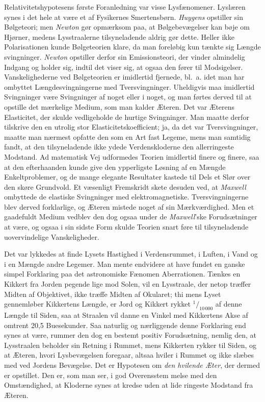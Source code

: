 \documentclass[12pt,a4paper]{article}
\newcommand{\opage}[1]{\marginnote{\footnotesize\textit{[#1]}}}
\begin{document}
Relativitetshypotesens første Foranledning var visse Lysfænomener. Lyslæren
synes i det hele at være et af Fysikernes Smertensbørn. \emph{Huygens}
opstiller sin Bølgeteori; men \emph{Newton} gør opmærksom paa, at
Bølgebevægelser kan bøje om Hjørner, medens Lysstraalerne tilsyneladende
aldrig gør dette. Heller ikke Polarisationen kunde Bølgeteorien klare, da man
foreløbig kun tænkte sig Længde\-%
\opage{3}svingninger. \emph{Newton} opstiller derfor sin Emissionsteori, der vinder
almindelig Indgang og holder sig, indtil det viser sig, at ogsaa den fører til
Modsigelser. Vanskelighederne ved Bølgeteorien er imidlertid fjernede, bl.\ a.
idet man har ombyttet Længdesvingningerne med Tversvingninger. Uheldigvis maa
imidlertid Svingninger være Svingninger af noget eller i noget, og man førtes
derved til at opstille det mærkelige \guillemotright Medium\guillemotleft, som
man kalder Æteren. Det var Æterens Elasticitet, der skulde vedligeholde de
hurtige Svingninger. Man maatte derfor tilskrive den en utrolig stor
Elasticitetskoefficient; ja, da det var Tversvingninger, maatte man nærmest
opfatte den som en Art fast Legeme, mens man samtidig fandt, at den
tilsyneladende ikke ydede Verdenskloderne den allerringeste Modstand. Ad
matematisk Vej udformedes Teorien imidlertid finere og finere, saa at den
efterhaanden kunde give den ypperligste Løsning af en Mængde Enkeltproblemer,
og de mange elegante Resultater kastede til Dels et Slør over den skøre
Grundvold. Et væsenligt Fremskridt skete desuden ved, at \emph{Maxwell}
ombyttede de elastiske Svingninger med elektromagnetiske. Tversvingningerne
blev derved forklarlige, og Æteren mistede noget af sin Mærkværdighed. Men et
gaadefuldt Medium vedblev den dog ogsaa under de \emph{Maxwell}'ske
Forudsætninger at være, og ogsaa i sin sidste Form skulde Teorien snart føre
til tilsyneladende uovervindelige Vanskeligheder.

Det var lykkedes at finde Lysets Hastighed i Verdensrummet, i Luften, i Vand
og i en Mængde andre Legemer. Man mente endvidere at have fundet en ganske
simpel Forklaring paa det astronomiske Fænomen Aberrationen. Tænkes en Kikkert
fra Jorden pegende lige mod Solen, vil en Lysstraale, der netop træffer Midten
af Objektivet, ikke træffe Midten af Okularet; thi mens Lyset gennemløber
Kikkertens Længde, er Jord og Kikkert rykket $^{1}\!/_{10\,000}$ af denne
Længde til Siden, saa at Straalen vil danne en Vinkel med Kikkertens Akse af
omtrent 20,5 Buesekunder. Saa naturlig og nærliggende denne Forklaring end
synes at være, rummer den dog en bestemt positiv Forudsætning, nemlig den, at
Lysstraalen beholder sin Retning i Rummet, mens Kikkerten rykker til Siden, og
at Æteren, hvori Lysbevægelsen foregaar, altsaa hviler i Rummet og ikke slæbes
med ved Jordens Bevægelse. Det er Hypotesen om \emph{den hvilende Æter}, der
dermed er opstillet. Den er, som man ser, i god Overensstem\-%
\opage{4}melse med den Omstændighed, at Kloderne synes at kredse uden at lide ringeste
Modstand fra Æteren.
\end{document}
